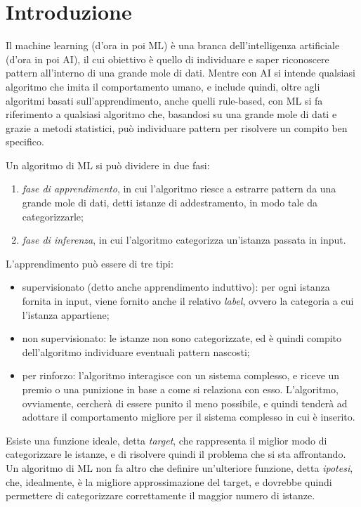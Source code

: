 \chapter{Introduzione}
Il machine learning (d'ora in poi ML) è una branca dell'intelligenza artificiale (d'ora in poi AI), il cui obiettivo è quello di individuare e saper riconoscere pattern all'interno di una grande mole di dati.
Mentre con AI si intende qualsiasi algoritmo che imita il comportamento umano, e include quindi, oltre agli algoritmi basati sull'apprendimento, anche quelli rule-based, con ML si fa riferimento a qualsiasi algoritmo che, basandosi su una grande mole di dati e grazie a metodi statistici, può individuare pattern per risolvere un compito ben specifico.

Un algoritmo di ML si può dividere in due fasi:
\begin{enumerate}
    \item \textit{fase di apprendimento}, in cui l'algoritmo riesce a estrarre pattern da una grande mole di dati, detti istanze di addestramento, in modo tale da categorizzarle;
    \item \textit{fase di inferenza}, in cui l'algoritmo categorizza un'istanza passata in input.
\end{enumerate}
L'apprendimento può essere di tre tipi:
\begin{itemize}
    \item supervisionato (detto anche apprendimento induttivo): per ogni istanza fornita in input, viene fornito anche il relativo \textit{label}, ovvero la categoria a cui l'istanza appartiene;
    \item non supervisionato: le istanze non sono categorizzate, ed è quindi compito dell'algoritmo individuare eventuali pattern nascosti;
    \item per rinforzo: l'algoritmo interagisce con un sistema complesso, e riceve un premio o una punizione in base a come si relaziona con esso. L'algoritmo, ovviamente, cercherà di essere punito il meno possibile, e quindi tenderà ad adottare il comportamento migliore per il sistema complesso in cui è inserito.
\end{itemize}
Esiste una funzione ideale, detta \textit{target}, che rappresenta il miglior modo di categorizzare le istanze, e di risolvere quindi il problema che si sta affrontando. Un algoritmo di ML non fa altro che definire un'ulteriore funzione, detta \textit{ipotesi}, che, idealmente, è la migliore approssimazione del target, e dovrebbe quindi permettere di categorizzare correttamente il maggior numero di istanze.

